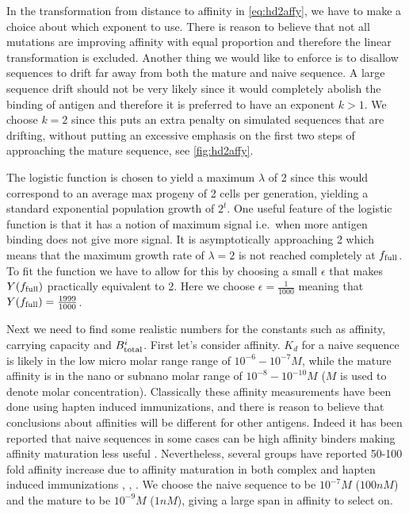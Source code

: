 In the transformation from distance to affinity in \eqref{eq:hd2affy}, we have to make a choice about which exponent to use.
There is reason to believe that not all mutations are improving affinity with equal proportion and therefore the linear transformation is excluded.
Another thing we would like to enforce is to disallow sequences to drift far away from both the mature and naive sequence.
A large sequence drift should not be very likely since it would completely abolish the binding of antigen and therefore it is preferred to have an exponent $k>1$.
We choose $k=2$ since this puts an extra penalty on simulated sequences that are drifting, without putting an excessive emphasis on the first two steps of approaching the mature sequence, see \ref{fig:hd2affy}.

The logistic function is chosen to yield a maximum $\lambda$ of 2 since this would correspond to an average max progeny of 2 cells per generation, yielding a standard exponential population growth of $2^t$.
One useful feature of the logistic function is that it has a notion of maximum signal i.e.\ when more antigen binding does not give more signal.
It is asymptotically approaching 2 which means that the maximum growth rate of $\lambda=2$ is not reached completely at $f_{\text{full}}$.
To fit the function we have to allow for this by choosing a small $\epsilon$ that makes $Y(f_{\text{full}})$ practically equivalent to 2.
Here we choose $\epsilon=\frac{1}{1000}$ meaning that $Y(f_{\text{full}}) = \frac{1999}{1000}$.

Next we need to find some realistic numbers for the constants such as affinity, carrying capacity and $B^i_{\text{total}}$.
First let's consider affinity.
$K_d$ for a naive sequence is likely in the low micro molar range range of $10^{-6} - 10^{-7} M$, while the mature affinity is in the nano or subnano molar range of $10^{-8} - 10^{-10} M$ \cite{berek1987mutation} ($M$ is used to denote molar concentration).
Classically these affinity measurements have been done using hapten induced immunizations, and there is reason to believe that conclusions about affinities will be different for other antigens.
Indeed it has been reported that naive sequences in some cases can be high affinity binders making affinity maturation less useful \cite{frank2015simple}.
Nevertheless, several groups have reported 50-100 fold affinity increase due to affinity maturation in both complex and hapten induced immunizations \cite{Kelsoe_2016}, \cite{phan2006high}, \cite{ulrich1997interplay}.
We choose the naive sequence to be $10^{-7} M$ ($100nM$) and the mature to be $10^{-9} M$ ($1nM$), giving a large span in affinity to select on.

